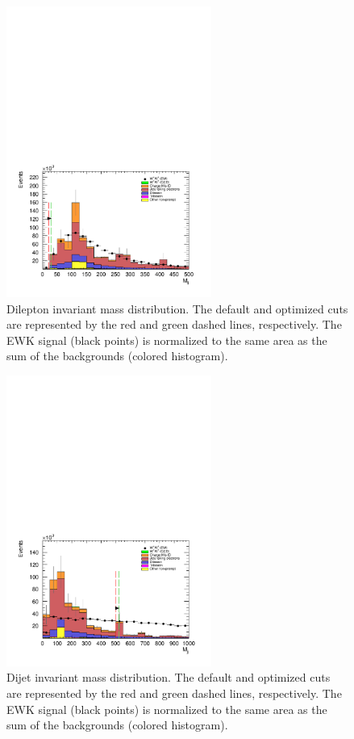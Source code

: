 \begin{figure}[htp]
  \centering
  \includegraphics[width=0.6\textwidth]{figs/ssww_upgrade/optimization_plots/mll}
  \caption{Dilepton invariant mass distribution.  The default and optimized cuts are represented by the red and green dashed lines, respectively.  The \ssww EWK signal (black points) is normalized to the same area as the sum of the backgrounds (colored histogram).}
  \label{fig:optimized_mll}
\end{figure}

\begin{figure}[htp]
  \centering
  \includegraphics[width=0.6\textwidth]{figs/ssww_upgrade/optimization_plots/mjj}
  \caption{Dijet invariant mass distribution.  The default and optimized cuts are represented by the red and green dashed lines, respectively.  The \ssww EWK signal (black points) is normalized to the same area as the sum of the backgrounds (colored histogram).}
  \label{fig:optimized_mjj}
\end{figure}
\FloatBarrier

